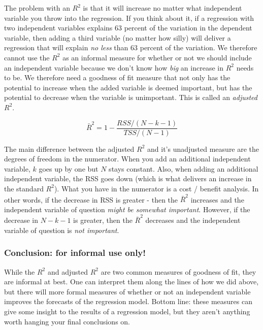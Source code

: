 \documentclass[
]{book}
\begin{document}
The problem with an \(R^2\) is that it will increase no matter what independent variable you throw into the regression. If you think about it, if a regression with two independent variables explains 63 percent of the variation in the dependent variable, then adding a third variable (no matter how silly) will deliver a regression that will explain \emph{no less} than 63 percent of the variation. We therefore cannot use the \(R^2\) as an informal measure for whether or not we should include an independent variable because we don't know how \emph{big} an increase in \(R^2\) needs to be. We therefore need a goodness of fit measure that not only has the potential to increase when the added variable is deemed important, but has the potential to decrease when the variable is unimportant. This is called an \emph{adjusted} \(R^2\).

\[\bar{R}^2 = 1 - \frac{RSS/(N-k-1)}{TSS/(N-1)}\]

The main difference between the adjusted \(R^2\) and it's unadjusted measure are the degrees of freedom in the numerator. When you add an additional independent variable, \(k\) goes up by one but \(N\) stays constant. Also, when adding an additional independent variable, the RSS goes down (which is what delivers an increase in the standard \(R^2\)). What you have in the numerator is a cost / benefit analysis. In other words, if the decrease in RSS is greater - then the \(\bar{R}^2\) increases and the independent variable of question \emph{might be somewhat important}. However, if the decrease in \(N-k-1\) is greater, then the \(\bar{R}^2\) decreases and the independent variable of question is \emph{not important}.

\hypertarget{conclusion-for-informal-use-only}{%
\subsubsection*{Conclusion: for informal use only!}\label{conclusion-for-informal-use-only}}

While the \(R^2\) and adjusted \(R^2\) are two common measures of goodness of fit, they are informal at best. One can interpret them along the lines of how we did above, but there will more formal measures of whether or not an independent variable improves the forecasts of the regression model. Bottom line: these measures can give some insight to the results of a regression model, but they aren't anything worth hanging your final conclusions on.
\end{document}
